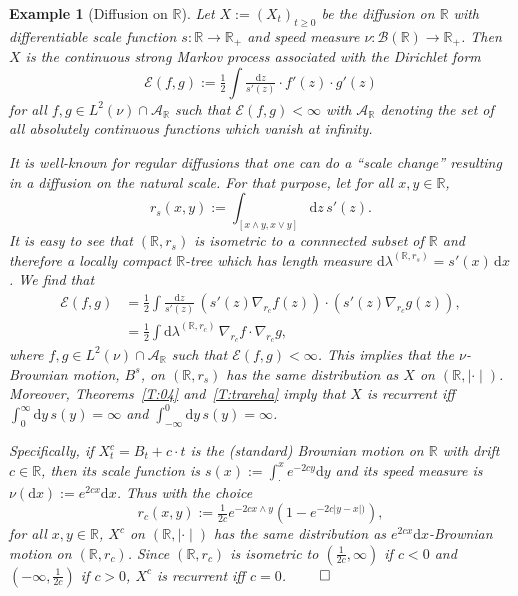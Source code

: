 \documentclass[11pt]{amsart}
\numberwithin{equation}{section}
\newtheorem{example}[definition]{Example}
\begin{document}
{\begin{example}[Diffusion on ${{\mathbb R}}$]\rm Let $X:=(X_t)_{t\ge 0}$ be the diffusion on ${{\mathbb R}}$ with differentiable scale function $s:{{\mathbb R}}\to{{\mathbb R}}_{+}$ and speed measure $\nu:{\mathcal B}({{\mathbb R}})\to{{\mathbb R}}_+$. Then $X$ is the
continuous strong Markov process associated with the Dirichlet form
\begin{equation}
\label{e:007}
     {\mathcal E}(f,g)
 :=
     \tfrac{1}{2}\int\tfrac{\mathrm{d}z}{s'(z)}\cdot f'(z)\cdot g'(z)
\end{equation}
for all $f,g\in L^2(\nu)\cap{\mathcal A}{_{{\mathbb R}}}$ such that ${\mathcal E}(f,g)<\infty$ with ${\mathcal A}{_{{\mathbb R}}}$ denoting the set of all absolutely continuous functions which vanish at infinity.

It is well-known for regular diffusions that one can do a ``scale change'' resulting in a diffusion on the natural scale.
For that purpose, let for all $x,y\in{{\mathbb R}}$,
\begin{equation}
\label{e:rc}
   r_{s}(x,y)
 :=
   \int_{[x\wedge y,x\vee y]}\mathrm{d}z\,s'(z).
\end{equation}
It is easy to see that $({{\mathbb R}},r_s)$ is isometric to a connnected subset of ${{\mathbb R}}$ {and therefore a locally compact} ${{\mathbb R}}$-tree which
has length measure $\mathrm{d}\lambda^{({{\mathbb R}},r_s)}=s'(x)\,\mathrm{d}x$.
We find that
\begin{equation}
\label{e:006}
\begin{aligned}
    {\mathcal E}(f,g)
 &=
    \frac{1}{2}\int\tfrac{\mathrm{d}z}{s'(z)}\,(s'(z)\nabla_{r_c} f(z))\cdot (s'(z)\nabla_{r_c} g(z)),
   \\
 &=
    \frac{1}{2}\int\mathrm{d}\lambda^{({{\mathbb R}},r_c)}\,\nabla_{r_c} f\cdot \nabla_{r_c} g,
\end{aligned}
\end{equation}
where $f,g\in L^2(\nu)\cap{\mathcal A}{_{{\mathbb R}}}$ such that ${\mathcal E}(f,g)<\infty$.
This implies that the $\nu$-Brownian motion, $B^{s}$, on $({{\mathbb R}},r_{s})$ has the same distribution as $X$ on $({{\mathbb R}},\mid\boldsymbol{\cdot}\mid)$.
Moreover, Theorems~\ref{T:04} and~\ref{T:trareha} imply that $X$ is recurrent iff $\int_0^\infty\mathrm{d}y\,s(y)=\infty$ and  $\int_{-\infty}^0\mathrm{d}y\,s(y)=\infty$.
\label{Exp:03}

Specifically, if $X^c_{t} = B_{t} + c\cdot t$ is the (standard) Brownian motion on ${{\mathbb R}}$ with drift $c\in{{\mathbb R}}$, then its
scale function is $s(x):=\int^x_{\cdot}e^{-2cy}\mathrm{d}y$ and its speed measure is $\nu(\mathrm{d}x):=e^{2cx}\mathrm{d}x$. Thus with the choice
\begin{equation}
   r_{c}(x,y)
 :=
   \tfrac{1}{2c}e^{-2c x\wedge y}(1-e^{-2c|y-x|)}),
\end{equation}
for all $x,y\in{{\mathbb R}}$,
$X^c$ on $({{\mathbb R}},\mid\boldsymbol{\cdot}\mid)$ has the same distribution as $e^{2cx}\mathrm{d}x$-Brownian motion on $({{\mathbb R}},r_c)$.
Since
$({{\mathbb R}},r_c)$ is isometric
to $(\tfrac{1}{2c},\infty)$ if $c<0$ and $(-\infty,\tfrac{1}{2c})$ if $c>0$, $X^c$ is recurrent iff $c=0$.
\hfill$\qed$
\end{example}{\smallskip}

}
\end{document}
